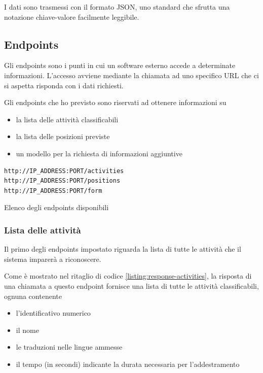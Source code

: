 I dati sono trasmessi con il formato JSON, uno standard che sfrutta una notazione chiave-valore facilmente leggibile.


\subsection{Endpoints}
Gli endpoints sono i punti in cui un software esterno accede a determinate informazioni. L'accesso avviene mediante la chiamata ad uno 
specifico URL che ci si aspetta risponda con i dati richiesti.

Gli endpoints che ho previsto sono riservati ad ottenere informazioni su
\begin{itemize}
    \item la lista delle attività classificabili
    \item la lista delle posizioni previste
    \item un modello per la richiesta di informazioni aggiuntive
\end{itemize}

\begin{listing}[H] 
    \begin{verbatim}
http://IP_ADDRESS:PORT/activities
http://IP_ADDRESS:PORT/positions
http://IP_ADDRESS:PORT/form
    \end{verbatim}
    \caption{Elenco degli endpoints disponibili}
    \label{listing:endpoint-positions}
\end{listing}

\subsubsection{Lista delle attività}
Il primo degli endpoints impostato riguarda la lista di tutte le attività che il sistema imparerà a riconoscere.

Come è mostrato nel ritaglio di codice \ref{listing:response-activities}, la risposta di una chiamata a questo endpoint fornisce una lista 
di tutte le attività classificabili, ognuna contenente 
\begin{itemize}
    \item l'identificativo numerico
    \item il nome
    \item le traduzioni nelle lingue ammesse
    \item il tempo (in secondi) indicante la durata necessaria per l'addestramento
\end{itemize}

